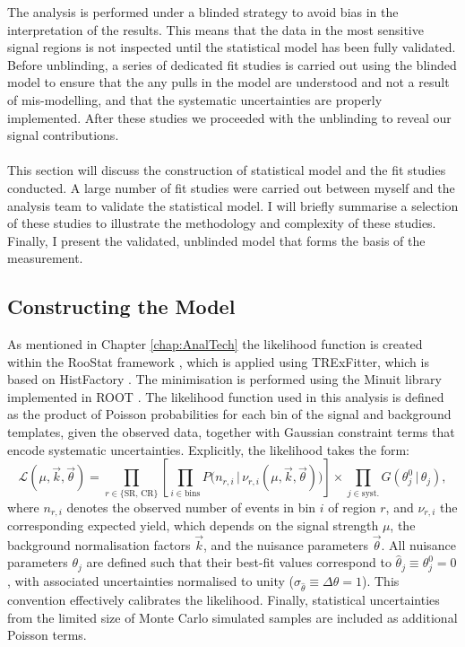The analysis is performed under a blinded strategy to avoid bias in the interpretation of the results. This means that the data in the most sensitive signal regions is not inspected until the statistical model has been fully validated. Before unblinding, a series of dedicated fit studies is carried out using the blinded model to ensure that the any pulls in the model are understood and not a result of mis-modelling, and that the systematic uncertainties are properly implemented. After these studies we proceeded with the unblinding to reveal our signal contributions.\\
\\
This section will discuss the construction of statistical model and the fit studies conducted. A large number of fit studies were carried out between myself and the analysis team to validate the statistical model. I will briefly summarise a selection of these studies to illustrate the methodology and complexity of these studies. Finally, I present the validated, unblinded model that forms the basis of the measurement.
\subsection{Constructing the Model}
As mentioned in Chapter \ref{chap:AnalTech} the likelihood function is created within the RooStat framework \cite{roostats1,roostats2}, which is applied using TRExFitter, which is based on HistFactory \cite{histlab}. The minimisation is performed using the Minuit library implemented in ROOT \cite{minut,root}. The likelihood function used in this analysis is defined as the product of Poisson probabilities for each bin of the signal and background templates, given the observed data, together with Gaussian constraint terms that encode systematic uncertainties. Explicitly, the likelihood takes the form:
\begin{equation}
\mathcal{L}(\mu, \vec{k}, \vec{\theta}) = 
\prod_{r \in \{\text{SR, CR}\}}
\left[
\prod_{i \in \text{bins}} 
P \big( n_{r,i} \,|\, \nu_{r,i}(\mu, \vec{k}, \vec{\theta}) \big)
\right]
\times
\prod_{j \in \text{syst.}} 
G(\theta^0_j \,|\, \theta_j),
\label{eq:likelihood}
\end{equation}
where $n_{r,i}$ denotes the observed number of events in bin $i$ of region $r$, and $\nu_{r,i}$ the corresponding expected yield, which depends on the signal strength $\mu$, the background normalisation factors $\vec{k}$, 
and the nuisance parameters $\vec{\theta}$. All nuisance parameters $\theta_j$ are defined such that their best-fit values correspond to $\hat{\theta}_j \equiv \theta^0_j = 0$, with associated uncertainties normalised to unity ($\sigma_{\hat{\theta}} \equiv \Delta \theta = 1$). This convention effectively calibrates the likelihood. Finally, statistical uncertainties from the limited size of Monte Carlo simulated samples are included as additional Poisson terms.


